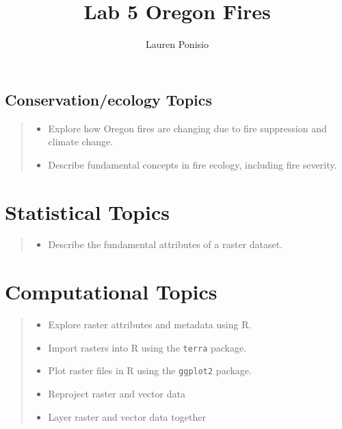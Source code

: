 \documentclass[
]{article}
\title{Lab 5 Oregon Fires}
\author{Lauren Ponisio}
\date{}
\providecommand{\tightlist}{%
  \setlength{\itemsep}{0pt}\setlength{\parskip}{0pt}}
\begin{document}
\maketitle

\hypertarget{conservationecology-topics}{%
\subsection{Conservation/ecology
Topics}\label{conservationecology-topics}}

\begin{quote}
\begin{itemize}
\tightlist
\item
  Explore how Oregon fires are changing due to fire suppression and
  climate change.
\item
  Describe fundamental concepts in fire ecology, including fire
  severity.
\end{itemize}
\end{quote}

\hypertarget{statistical-topics}{%
\section{Statistical Topics}\label{statistical-topics}}

\begin{quote}
\begin{itemize}
\tightlist
\item
  Describe the fundamental attributes of a raster dataset.
\end{itemize}
\end{quote}

\hypertarget{computational-topics}{%
\section{Computational Topics}\label{computational-topics}}

\begin{quote}
\begin{itemize}
\tightlist
\item
  Explore raster attributes and metadata using R.
\item
  Import rasters into R using the \texttt{terra} package.
\item
  Plot raster files in R using the \texttt{ggplot2} package.
\item
  Reproject raster and vector data
\item
  Layer raster and vector data together
\end{itemize}
\end{quote}
\end{document}
